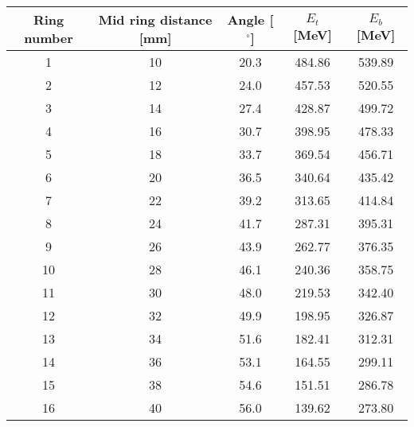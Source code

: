 \begin{tabular}{ccccc}
\hline
Ring number  &  Mid ring distance [mm]  &  Angle [$^\circ$]  &  $E_t$ [MeV]  &  $E_b$ [MeV]  \\
\hline
1            &  10                      &  20.3              &  484.86       &  539.89       \\
2            &  12                      &  24.0              &  457.53       &  520.55       \\
3            &  14                      &  27.4              &  428.87       &  499.72       \\
4            &  16                      &  30.7              &  398.95       &  478.33       \\
5            &  18                      &  33.7              &  369.54       &  456.71       \\
6            &  20                      &  36.5              &  340.64       &  435.42       \\
7            &  22                      &  39.2              &  313.65       &  414.84       \\
8            &  24                      &  41.7              &  287.31       &  395.31       \\
9            &  26                      &  43.9              &  262.77       &  376.35       \\
10           &  28                      &  46.1              &  240.36       &  358.75       \\
11           &  30                      &  48.0              &  219.53       &  342.40       \\
12           &  32                      &  49.9              &  198.95       &  326.87       \\
13           &  34                      &  51.6              &  182.41       &  312.31       \\
14           &  36                      &  53.1              &  164.55       &  299.11       \\
15           &  38                      &  54.6              &  151.51       &  286.78       \\
16           &  40                      &  56.0              &  139.62       &  273.80       \\
\hline
\end{tabular}